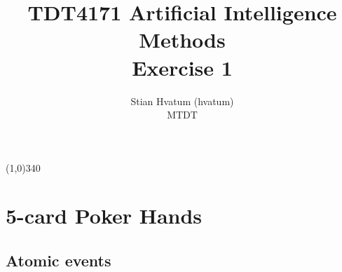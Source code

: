 \documentclass[english]{article}
\title{TDT4171 Artificial Intelligence Methods\\
\Huge Exercise 1}
\author{Stian Hvatum (hvatum)\\MTDT}
\begin{document}
\maketitle
\line(1,0){340} %
\tableofcontents
\newpage
\section{5-card Poker Hands}
\subsection{Atomic events}
\end{document}
